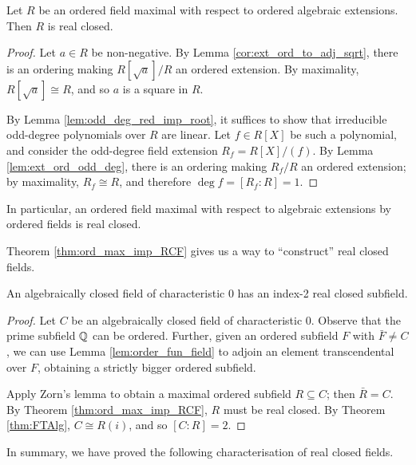 \begin{theorem}
  \label{thm:ord_max_imp_RCF}
  Let $R$ be an ordered field maximal with respect to ordered algebraic extensions. Then $R$ is real closed.
\end{theorem}
\begin{proof}
  Let $a\in R$ be non-negative. By Lemma \ref{cor:ext_ord_to_adj_sqrt}, there is an ordering making $R[\sqrt{a}]/R$ an ordered extension. By maximality, $R[\sqrt{a}]\cong R$, and so $a$ is a square in $R$.

  By Lemma \ref{lem:odd_deg_red_imp_root}, it suffices to show that irreducible odd-degree polynomials over $R$ are linear. Let $f\in R[X]$ be such a polynomial, and consider the odd-degree field extension $R_f=R[X]/(f)$. By Lemma \ref{lem:ext_ord_odd_deg}, there is an ordering making $R_f/R$ an ordered extension; by maximality, $R_f\cong R$, and therefore $\deg f=[R_f:R]=1$.
\end{proof}

In particular, an ordered field maximal with respect to algebraic extensions by ordered fields is real closed.

Theorem \ref{thm:ord_max_imp_RCF} gives us a way to ``construct'' real closed fields.

\begin{lemma}
  \label{lem:ACF_ind_2_RCF}
  An algebraically closed field of characteristic 0 has an index-2 real closed subfield.
\end{lemma}
\begin{proof}
  Let $C$ be an algebraically closed field of characteristic 0. Observe that the prime subfield $\mathbb{Q}$ can be ordered. Further, given an ordered subfield $F$ with $\bar{F}\neq C$, we can use Lemma \ref{lem:order_fun_field} to adjoin an element transcendental over $F$, obtaining a strictly bigger ordered subfield.
  
  Apply Zorn's lemma to obtain a maximal ordered subfield $R\subseteq C$; then $\bar{R}=C$. By Theorem \ref{thm:ord_max_imp_RCF}, $R$ must be real closed. By Theorem \ref{thm:FTAlg}, $C\cong R(i)$, and so $[C:R]=2$.
\end{proof}

In summary, we have proved the following characterisation of real closed fields.

